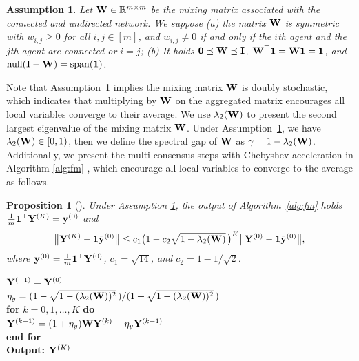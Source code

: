 \documentclass[sigconf]{acmart}
\def\vy{{\bf{y}}}
\def\mI {{\bf I}}
\def\mW {{\bf W}}
\def\mY {{\bf Y}}
\theoremstyle{plain}
\newtheorem{asm}{Assumption}
\newtheorem{prop}{Proposition}
\def\AG{{\rm AccGossip}}
\begin{document}
\begin{asm}\label{ams:W}
Let $\mW\in \mathbb{R}^{m \times m}$ be the mixing matrix associated with the connected and undirected network. 
We suppose
(a) the matrix $\mW$ is symmetric with $w_{i,j} \ge 0$ for all $i,j\in[m]$, and $w_{i,j} \neq 0$ if and only if the $i$th agent and the $j$th agent are connected or $i = j$;
(b) It holds $\mathbf{0} \preceq \mW \preceq \mI$, $\mW^\top \mathbf{1}=\mW \mathbf{1} = \mathbf{1}$, and $\operatorname{null}(\mI - \mW) = \operatorname{span}(\mathbf{1})$.
\end{asm}

Note that Assumption~\ref{ams:W} implies the mixing matrix $\mW$ is doubly stochastic, which indicates that multiplying by $\mW$ on the aggregated matrix encourages all local variables converge to their average.
We use $\lambda_2(\mW)$ to present the second largest eigenvalue of the mixing matrix $\mW$. Under Assumption~\ref{ams:W}, we have $\lambda_2(\mW)\in[0,1)$, then we define the spectral gap of $\mW$ as $\gamma=1-\lambda_2(\mW)$.
Additionally, we present the multi-consensus steps with Chebyshev acceleration in Algorithm \ref{alg:fm} \citep{liu2011accelerated,arioli2014chebyshev}, which encourage all local variables to converge to the average as follows.

\begin{prop}[{\citet[Proposition 1]{ye2023multi}}]
\label{proposition_fastmix}
    Under Assumption \ref{ams:W}, the output of Algorithm~\ref{alg:fm} holds $\frac{1}{m} \mathbf{1}^\top \mY^{(K)} = \bar{\vy}^{(0)}$ and
    \begin{align*}
    \big\|\mY^{(K)} - \mathbf{1} \bar{\vy}^{(0)} \big\| \leq c_1 \big(1 - c_2 \sqrt{1-\lambda_2(\mW)}\,\big)^K \big\| \mY^{(0)} - \mathbf{1} \bar{\vy}^{(0)}\big\|,     
    \end{align*}    
    where $\bar{\vy}^{(0)} = \frac{1}{m} \mathbf{1}^\top \mY^{(0)}$, $c_1 = \sqrt{14}$, and $c_2 = 1 - 1/\sqrt{2}$.
\end{prop}

\begin{algorithm}[t]
	\caption{$\AG(\mY^{(0)},\mW, K)$} \label{alg:fm}
	\begin{algorithmic}[1]
		\STATE $\mY^{(-1)}=\mY^{(0)}$ \\[0.1cm]
        \STATE $\eta_y=(1-\sqrt{1-(\lambda_2(\mW))^2}\,)/(1+\sqrt{1-(\lambda_2(\mW))^2}\,)$ \\[0.1cm]
		\STATE \textbf{for} $k = 0, 1, \dots, K$ \textbf{do}\\[0.1cm]
		\STATE\quad $\mY^{(k+1)}=(1+\eta_y)\mW\mY^{(k)}-\eta_y\mY^{(k-1)}$ \\[0.1cm]
		\STATE\textbf{end for} \\[0.1cm]
		\STATE \textbf{Output:} $\mY^{(K)}$
	\end{algorithmic}
\end{algorithm}
\end{document}
